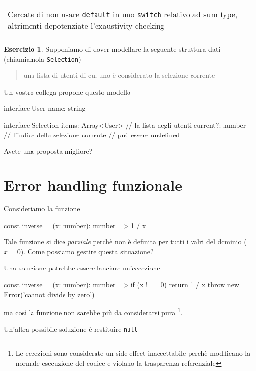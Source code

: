 \documentclass[12pt]{article}
\theoremstyle{definition}
\newtheorem{exercise}{Esercizio}[subsection]
\newenvironment{boxed}
    {\begin{center}
    \begin{tabular}{|p{0.9\textwidth}|}
    \hline\\
    }
    {
    \\\\\hline
    \end{tabular}
    \end{center}
    }
\newenvironment{code}
  {\vspace{0.5cm} \VerbatimEnvironment\begin{typescriptcode}}
  {\end{typescriptcode} \vspace{0.2cm}}
\begin{document}
\begin{boxed}
Cercate di non usare \texttt{default} in uno \texttt{switch} relativo ad sum type, altrimenti depotenziate l'exaustivity checking
\end{boxed}

\begin{exercise}
Supponiamo di dover modellare la seguente struttura dati (chiamiamola \texttt{Selection})

\begin{quote}
una lista di utenti di cui uno è considerato la selezione corrente
\end{quote}

Un vostro collega propone questo modello

\begin{code}
interface User {
  name: string
}

interface Selection {
  items: Array<User> // la lista degli utenti
  current?: number   // l'indice della selezione corrente
                     // può essere undefined
}
\end{code}

Avete una proposta migliore?
\end{exercise}

\newpage
\section{Error handling funzionale}

Consideriamo la funzione

\begin{code}
const inverse = (x: number): number => 1 / x
\end{code}

Tale funzione si dice \emph{parziale} perchè non è definita per tutti i valri del dominio ($x = 0$).
Come possiamo gestire questa situazione?

Una soluzione potrebbe essere lanciare un'eccezione

\begin{code}
const inverse = (x: number): number => {
  if (x !== 0) return 1 / x
  throw new Error('cannot divide by zero')
}
\end{code}

ma così la funzione non sarebbe più da considerarsi pura
\footnote{Le eccezioni sono considerate un side effect inaccettabile perchè modificano la normale esecuzione del codice
e violano la trasparenza referenziale}.

Un'altra possibile soluzione è restituire \texttt{null}
\end{document}
